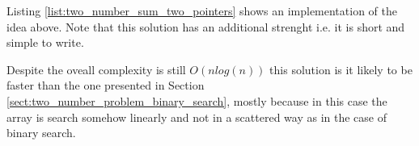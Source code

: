 Listing \ref{list:two_number_sum_two_pointers} shows an implementation of the idea above.  Note that this solution has an additional strenght i.e.  it is short and simple to write. 



Despite the oveall complexity is still $O(n log(n))$ this solution is it likely to be faster than the one presented in Section \ref{sect:two_number_problem_binary_search}, mostly because in this case the array is search somehow linearly and not in a scattered way as in the case of binary search.

